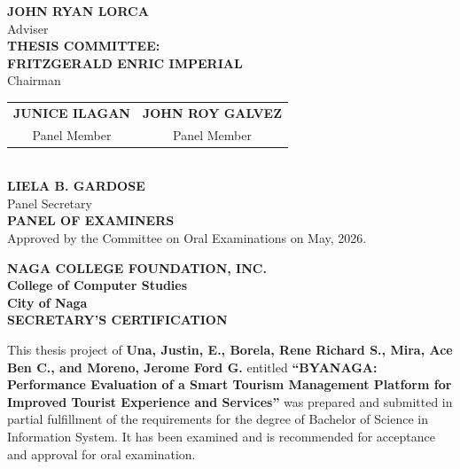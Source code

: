 \documentclass{research}
\begin{document}
\vspace{2.5em}

\begin{center}
  {\bfseries JOHN RYAN LORCA}\\
  Adviser\\[3.5em]

  {\bfseries THESIS COMMITTEE:}\\[2em]

  {\bfseries FRITZGERALD ENRIC IMPERIAL}\\
  Chairman\\[2.5em]

  \begin{tabular}{cc}
    {\bfseries JUNICE ILAGAN} & {\bfseries JOHN ROY GALVEZ}\\
    Panel Member & Panel Member
  \end{tabular}\\[2.5em]

  {\bfseries LIELA B. GARDOSE}\\
  Panel Secretary\\[3.5em]

  {\bfseries PANEL OF EXAMINERS}\\[2.5em]

  Approved by the Committee on Oral Examinations on May, 2026.
\end{center}

\vfill
\clearpage

\thispagestyle{empty}
\begin{center}
  {\bfseries NAGA COLLEGE FOUNDATION, INC.}\\[0.5em]
  {\bfseries College of Computer Studies}\\[0.5em]
  {\bfseries City of Naga}\\[2em]
  {\bfseries SECRETARY'S CERTIFICATION}
\end{center}

\vspace{1.5em}

\noindent
This thesis project of \textbf{Una, Justin, E., Borela, Rene Richard S., Mira, Ace Ben C., and Moreno, Jerome Ford G.} entitled \textbf{``BYANAGA: Performance Evaluation of a Smart Tourism Management Platform for Improved Tourist Experience and Services''} was prepared and submitted in partial fulfillment of the requirements for the degree of Bachelor of Science in Information System. It has been examined and is recommended for acceptance and approval for oral examination.

\vspace{5em}
\end{document}
